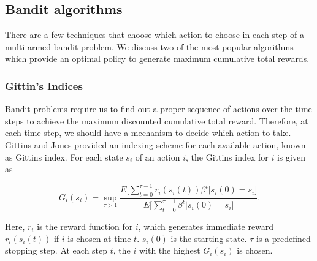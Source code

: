 \documentclass[english]{tktltiki}
\begin{document}
\subsection{Bandit algorithms}

There are a few techniques that choose which action to choose in each step of a multi-armed-bandit problem. We discuss two of the most popular algorithms which provide an optimal policy to generate maximum cumulative total rewards.

\subsubsection{Gittin's Indices}

Bandit problems require us to find out a proper sequence of actions over the time steps to achieve the maximum discounted cumulative total reward. Therefore, at each time step, we should have a mechanism to decide which action to take. Gittins and Jones \cite{gittins_indices} provided an indexing scheme for each available action, known as Gittins index. For each state $s_i$ of an action $i$, the Gittins index for $i$ is given as

\begin{equation}
G_i(s_i) = \sup_{\tau > 1}{\frac{E\Big[\sum_{t = 0}^{\tau - 1} r_i(s_i(t))\beta^t | s_i(0) = s_i\Big]}{E\Big[\sum_{t = 0}^{\tau - 1}\beta^t | s_i(0) = s_i\Big]}}.
\end{equation}

Here, $r_i$ is the reward function for $i$, which generates immediate reward  $r_i(s_i(t))$ if $i$ is chosen at time $t$. $s_i(0)$ is the starting state. $\tau$ is a predefined stopping step. At each step $t$, the $i$ with the highest $G_i(s_i)$ is chosen.
\end{document}
